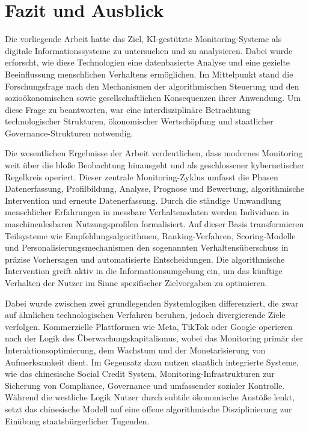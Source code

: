 \chapter{Fazit und Ausblick}

Die vorliegende Arbeit hatte das Ziel, \ac{KI}-gestützte Monitoring-Systeme als digitale Informationssysteme zu untersuchen und zu analysieren. Dabei wurde erforscht, wie diese Technologien eine datenbasierte Analyse und eine gezielte Beeinflussung menschlichen Verhaltens ermöglichen. Im Mittelpunkt stand die Forschungsfrage nach den Mechanismen der algorithmischen Steuerung und den sozioökonomischen sowie gesellschaftlichen Konsequenzen ihrer Anwendung. Um diese Frage zu beantworten, war eine interdisziplinäre Betrachtung technologischer Strukturen, ökonomischer Wertschöpfung und staatlicher Governance-Strukturen notwendig.

Die wesentlichen Ergebnisse der Arbeit verdeutlichen, dass modernes Monitoring weit über die bloße Beobachtung hinausgeht und als geschlossener kybernetischer Regelkreis operiert. Dieser zentrale Monitoring-Zyklus umfasst die Phasen Datenerfassung, Profilbildung, Analyse, Prognose und Bewertung, algorithmische Intervention und erneute Datenerfassung. Durch die ständige Umwandlung menschlicher Erfahrungen in messbare Verhaltensdaten werden Individuen in maschinenlesbaren Nutzungsprofilen formalisiert. Auf dieser Basis transformieren Teilsysteme wie Empfehlungsalgorithmen, Ranking-Verfahren, Scoring-Modelle und Personalisierungsmechanismen den sogenannten Verhaltensüberschuss in präzise Vorhersagen und automatisierte Entscheidungen. Die algorithmische Intervention greift aktiv in die Informationsumgebung ein, um das künftige Verhalten der Nutzer im Sinne spezifischer Zielvorgaben zu optimieren.

Dabei wurde zwischen zwei grundlegenden Systemlogiken differenziert, die zwar auf ähnlichen technologischen Verfahren beruhen, jedoch divergierende Ziele verfolgen. Kommerzielle Plattformen wie Meta, TikTok oder Google operieren nach der Logik des Überwachungskapitalismus, wobei das Monitoring primär der Interaktionsoptimierung, dem Wachstum und der Monetarisierung von Aufmerksamkeit dient. Im Gegensatz dazu nutzen staatlich integrierte Systeme, wie das chinesische Social Credit System, Monitoring-Infrastrukturen zur Sicherung von Compliance, Governance und umfassender sozialer Kontrolle. Während die westliche Logik Nutzer durch subtile ökonomische Anstöße lenkt, setzt das chinesische Modell auf eine offene algorithmische Disziplinierung zur Einübung staatsbürgerlicher Tugenden.

